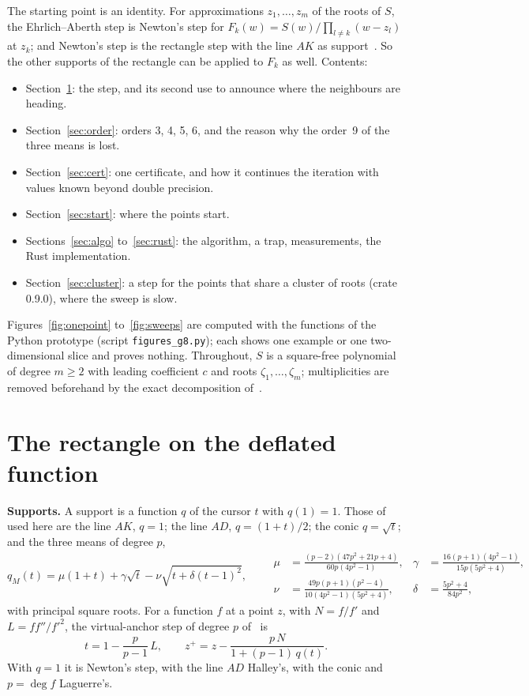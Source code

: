 \documentclass[10pt,a4paper]{article}
\theoremstyle{definition}
\numberwithin{equation}{section}
\begin{document}
The starting point is an identity. For approximations $z_1,\dots,z_m$ of the roots of $S$, the
Ehrlich--Aberth step is Newton's step for $F_k(w)=S(w)/\prod_{l\ne k}(w-z_l)$ at $z_k$; and Newton's
step is the rectangle step with the line $AK$ as support~\cite{v29,g2}. So the other supports of the
rectangle can be applied to $F_k$ as well. Contents:
\begin{itemize}
\item Section~\ref{sec:step}: the step, and its second use to announce where the neighbours are
 heading.
\item Section~\ref{sec:order}: orders 3, 4, 5, 6, and the reason why the order~9 of the three means
 is lost.
\item Section~\ref{sec:cert}: one certificate, and how it continues the iteration with values known
 beyond double precision.
\item Section~\ref{sec:start}: where the points start.
\item Sections~\ref{sec:algo} to~\ref{sec:rust}: the algorithm, a trap, measurements, the Rust
 implementation.
\item Section~\ref{sec:cluster}: a step for the points that share a cluster of roots (crate 0.9.0),
 where the sweep is slow.
\end{itemize}
Figures~\ref{fig:onepoint} to~\ref{fig:sweeps} are computed with the functions of the Python prototype
(script \texttt{figures\_g8.py}); each shows one example or one two-dimensional slice and proves nothing.
Throughout, $S$ is a square-free polynomial of degree $m\ge2$ with leading coefficient $c$ and roots
$\zeta_1,\dots,\zeta_m$; multiplicities are removed beforehand by the exact decomposition
of~\cite{g5,g6}.

\section{The rectangle on the deflated function}\label{sec:step}
\textbf{Supports.} A support is a function $q$ of the cursor $t$ with $q(1)=1$. Those of~\cite{v29}
used here are the line $AK$, $q=1$; the line $AD$, $q=(1+t)/2$; the conic $q=\sqrt t$; and the three
means of degree $p$,
\[
 q_M(t)=\mu(1+t)+\gamma\sqrt t-\nu\sqrt{t+\delta(t-1)^2},\qquad
 \begin{aligned}
 \mu&=\tfrac{(p-2)(47p^2+21p+4)}{60p(4p^2-1)}, & \gamma&=\tfrac{16(p+1)(4p^2-1)}{15p(5p^2+4)},\\
 \nu&=\tfrac{49p(p+1)(p^2-4)}{10(4p^2-1)(5p^2+4)}, & \delta&=\tfrac{5p^2+4}{84p^2},
 \end{aligned}
\]
with principal square roots. For a function $f$ at a point $z$, with $N=f/f'$ and $L=ff''/f'^2$, the
virtual-anchor step of degree $p$ of~\cite{g2} is
\begin{equation}\label{eq:g2}
 t=1-\frac{p}{p-1}\,L,\qquad z^+=z-\frac{p\,N}{1+(p-1)\,q(t)} .
\end{equation}
With $q=1$ it is Newton's step, with the line $AD$ Halley's, with the conic and $p=\deg f$ Laguerre's.
\end{document}
